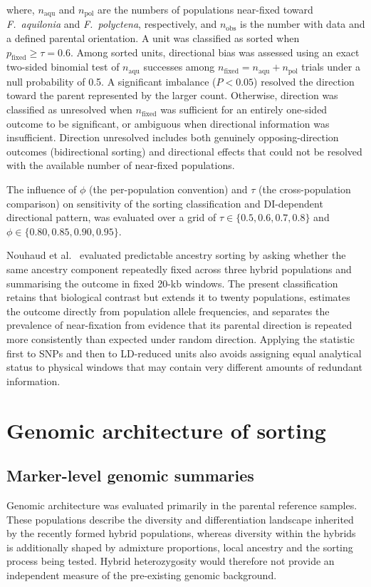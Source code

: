 \documentclass[11pt]{article}
\newcommand{\Faq}{\textit{F.~aquilonia}}
\newcommand{\Fpo}{\textit{F.~polyctena}}
\begin{document}
where, \(n_{\mathrm{aqu}}\) and \(n_{\mathrm{pol}}\) are the numbers of populations near-fixed toward \Faq{} and \Fpo{}, respectively, and \(n_{\mathrm{obs}}\) is the number with data and a defined parental orientation. A unit was classified as sorted when \(p_{\mathrm{fixed}}\geq\tau=0.6\). Among sorted units, directional bias was assessed using an exact two-sided binomial test of \(n_{\mathrm{aqu}}\) successes among \(n_{\mathrm{fixed}}=n_{\mathrm{aqu}}+n_{\mathrm{pol}}\) trials under a null probability of 0.5. A significant imbalance (\(P<0.05\)) resolved the direction toward the parent represented by the larger count. Otherwise, direction was classified as unresolved when \(n_{\mathrm{fixed}}\) was sufficient for an entirely one-sided outcome to be significant, or ambiguous when directional information was insufficient. Direction unresolved includes both genuinely opposing-direction outcomes (bidirectional sorting) and directional effects that could not be resolved with the available number of near-fixed populations.

The influence of \(\phi\) (the per-population convention) and \(\tau\) (the cross-population comparison) on sensitivity of the sorting classification and DI-dependent directional pattern, was evaluated over a grid of \(\tau\in\{0.5,0.6,0.7,0.8\}\) and \(\phi\in\{0.80,0.85,0.90,0.95\}\).

Nouhaud et al.~\citep{nouhaud2022rapid-cfc} evaluated predictable ancestry sorting by asking whether the same ancestry component repeatedly fixed across three hybrid populations and summarising the outcome in fixed 20-kb windows. The present classification retains that biological contrast but extends it to twenty populations, estimates the outcome directly from population allele frequencies, and separates the prevalence of near-fixation from evidence that its parental direction is repeated more consistently than expected under random direction. Applying the statistic first to SNPs and then to LD-reduced units also avoids assigning equal analytical status to physical windows that may contain very different amounts of redundant information.

\section*{Genomic architecture of sorting}

\subsection*{Marker-level genomic summaries}
Genomic architecture was evaluated primarily in the parental reference samples. These populations describe the diversity and differentiation landscape inherited by the recently formed hybrid populations, whereas diversity within the hybrids is additionally shaped by admixture proportions, local ancestry and the sorting process being tested. Hybrid heterozygosity would therefore not provide an independent measure of the pre-existing genomic background.
\end{document}
